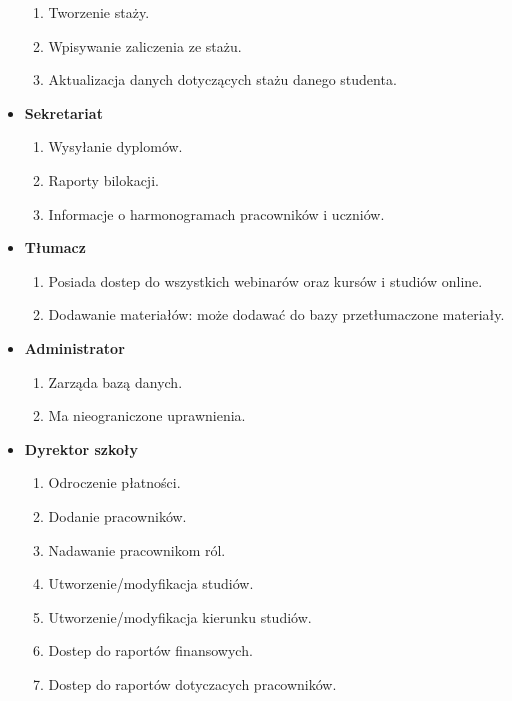 \documentclass[11pt]{article}
\begin{document}
\begin{itemize}
\begin{enumerate}
\item Tworzenie staży.
\item Wpisywanie zaliczenia ze stażu.
\item Aktualizacja danych dotyczących stażu danego studenta.
\end{enumerate}
\item \textbf{Sekretariat}
\begin{enumerate}
\item Wysyłanie dyplomów.
\item Raporty bilokacji.
\item Informacje o harmonogramach pracowników i uczniów.
\end{enumerate}
\item \textbf{Tłumacz}
\begin{enumerate}
\item Posiada dostep do wszystkich webinarów oraz kursów i studiów online.
\item Dodawanie materiałów: może dodawać do bazy przetłumaczone materiały.
\end{enumerate}
\item \textbf{Administrator}
\begin{enumerate}
\item Zarząda bazą danych.
\item Ma nieograniczone uprawnienia.
\end{enumerate}
\item \textbf{Dyrektor szkoły}
\begin{enumerate}
\item Odroczenie płatności.
\item Dodanie pracowników.
\item Nadawanie pracownikom ról.
\item Utworzenie/modyfikacja studiów.
\item Utworzenie/modyfikacja kierunku studiów.
\item Dostep do raportów finansowych.
\item Dostep do raportów dotyczacych pracowników.
\end{enumerate}
\end{itemize}
\end{document}
